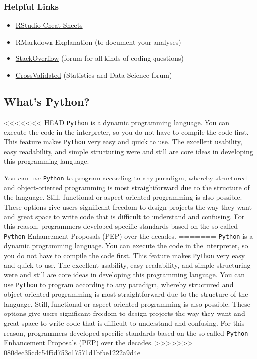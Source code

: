 \documentclass[
  11pt,
]{article}
\providecommand{\tightlist}{%
  \setlength{\itemsep}{0pt}\setlength{\parskip}{0pt}}
\begin{document}
\hypertarget{helpful-links}{%
\subsubsection{Helpful Links}\label{helpful-links}}

\begin{itemize}
\tightlist
\item
  \href{https://rstudio.cloud/learn/cheat-sheets}{RStudio Cheat Sheets}
\item
  \href{https://rmarkdown.rstudio.com/lesson-1.html}{RMarkdown Explanation} (to document your analyses)
\item
  \href{https://stackoverflow.com/}{StackOverflow} (forum for all kinds of coding questions)
\item
  \href{https://stats.stackexchange.com/}{CrossValidated} (Statistics and Data Science forum)
\end{itemize}

\hypertarget{whats-python}{%
\subsection{What's Python?}\label{whats-python}}

<<<<<<< HEAD
\texttt{Python} is a dynamic programming language.
You can execute the code in the interpreter, so you do not have to compile the code first.
This feature makes \texttt{Python} very easy and quick to use.
The excellent usability, easy readability, and simple structuring were and still are core ideas in developing this programming language.

You can use \texttt{Python} to program according to any paradigm, whereby structured and object-oriented programming is most straightforward due to the structure of the language.
Still, functional or aspect-oriented programming is also possible.
These options give users significant freedom to design projects the way they want and great space to write code that is difficult to understand and confusing.
For this reason, programmers developed specific standards based on the so-called \texttt{Python} Enhancement Proposals (PEP) over the decades.
=======
\texttt{Python} is a dynamic programming language. You can execute the code in the interpreter, so you do not have to compile the code first. This feature makes \texttt{Python} very easy and quick to use. The excellent usability, easy readability, and simple structuring were and still are core ideas in developing this programming language.
You can use \texttt{Python} to program according to any paradigm, whereby structured and object-oriented programming is most straightforward due to the structure of the language. Still, functional or aspect-oriented programming is also possible. These options give users significant freedom to design projects the way they want and great space to write code that is difficult to understand and confusing. For this reason, programmers developed specific standards based on the so-called \texttt{Python} Enhancement Proposals (PEP) over the decades.
>>>>>>> 080dec35cdc54f5d753c17571d1bfbe1222a9d4e
\end{document}
